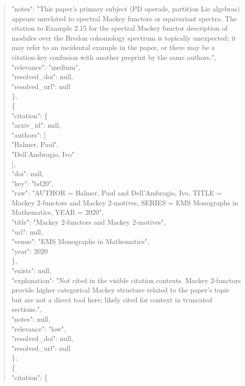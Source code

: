 \documentclass[11pt]{article}
\begin{document}
\begin{quote}
      "notes": "This paper's primary subject (PD operads, partition Lie algebras) appears unrelated to spectral Mackey functors or equivariant spectra. The citation to Example 2.15 for the spectral Mackey functor description of modules over the Bredon cohomology spectrum is topically unexpected; it may refer to an incidental example in the paper, or there may be a citation-key confusion with another preprint by the same authors.",\\
      "relevance": "medium",\\
      "resolved\_doi": null,\\
      "resolved\_url": null\\
    \},\\
    \{\\
      "citation": \{\\
        "arxiv\_id": null,\\
        "authors": [\\
          "Balmer, Paul",\\
          "Dell'Ambrogio, Ivo"\\
        ],\\
        "doi": null,\\
        "key": "bd20",\\
        "raw": "AUTHOR = Balmer, Paul and Dell'Ambrogio, Ivo, TITLE = Mackey 2-functors and Mackey 2-motives, SERIES = EMS Monographs in Mathematics, YEAR = 2020",\\
        "title": "Mackey 2-functors and Mackey 2-motives",\\
        "url": null,\\
        "venue": "EMS Monographs in Mathematics",\\
        "year": 2020\\
      \},\\
      "exists": null,\\
      "explanation": "Not cited in the visible citation contexts. Mackey 2-functors provide higher categorical Mackey structure related to the paper's topic but are not a direct tool here; likely cited for context in truncated sections.",\\
      "notes": null,\\
      "relevance": "low",\\
      "resolved\_doi": null,\\
      "resolved\_url": null\\
    \},\\
    \{\\
      "citation": \{\\

\end{quote}
\end{document}
